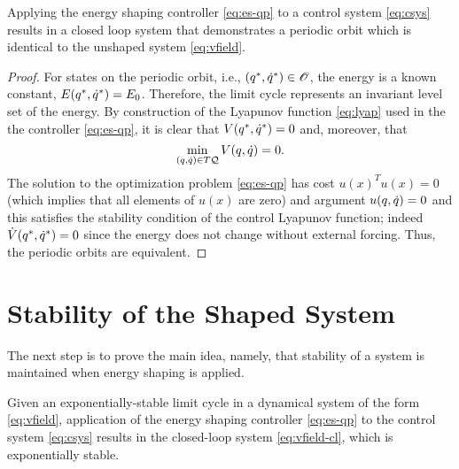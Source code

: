 \documentclass[twocolumn]{article}
\begin{document}
\begin{lemma}
  Applying the energy shaping controller \eqref{eq:es-qp} to a control system \eqref{eq:csys} results in a closed loop system that demonstrates a periodic orbit which is identical to the unshaped system \eqref{eq:vfield}.
\end{lemma}

\begin{proof}
  For states on the periodic orbit, i.e., $(q^{*}, \dot{q}^{*}) \in \mathscr{O}$, the energy is a known constant, $E(q^{*}, \dot{q}^{*}) = E_{0}$.
  Therefore, the limit cycle represents an invariant level set of the energy.
  By construction of the Lyapunov function \eqref{eq:lyap} used in the the controller \eqref{eq:es-qp}, it is clear that $V(q^{*}, \dot{q}^{*}) = 0$ and, moreover, that $$\min_{(q, \dot{q}) \in T\mathcal{Q}} V(q, \dot{q}) = 0.$$
  The solution to the optimization problem \eqref{eq:es-qp} has cost $u(x)^T u(x) = 0$ (which implies that all elements of $u(x)$ are zero) and argument $u(q, \dot{q}) = 0$ and this satisfies the stability condition of the control Lyapunov function; indeed ${\dot V}(q^{*}, \dot{q}^{*}) = 0$ since the energy does not change without external forcing.
  Thus, the periodic orbits are equivalent.
\end{proof}

\section{Stability of the Shaped System}

The next step is to prove the main idea, namely, that stability of a system is maintained when energy shaping is applied.

\begin{theorem}
  Given an exponentially-stable limit cycle in a dynamical system of the form \eqref{eq:vfield}, application of the energy shaping controller \eqref{eq:es-qp} to the control system \eqref{eq:csys} results in the closed-loop system \eqref{eq:vfield-cl}, which is exponentially stable.
\end{theorem}
\end{document}
